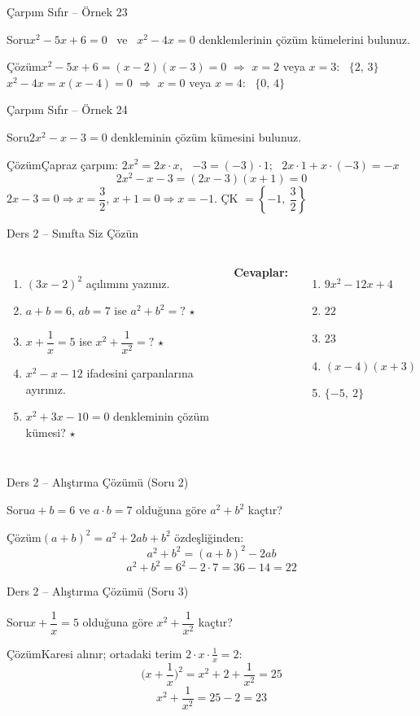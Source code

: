 \documentclass[aspectratio=169,11pt,handout]{beamer}
\newcommand{\soru}[3]{%
\begin{frame}{#1}
  \begin{block}{Soru}\large #2\end{block}
  \pause
  \begin{exampleblock}{Çözüm}\large #3\end{exampleblock}
\end{frame}}
\begin{document}
\soru{Çarpım Sıfır -- Örnek 23}
{\(x^2-5x+6=0\) \ ve \ \(x^2-4x=0\) denklemlerinin çözüm kümelerini bulunuz.}
{\(x^2-5x+6=(x-2)(x-3)=0\) \(\Rightarrow\) \(x=2\) veya \(x=3\): \ \(\{2,\,3\}\)\\[4pt]
\(x^2-4x=x(x-4)=0\) \(\Rightarrow\) \(x=0\) veya \(x=4\): \ \(\{0,\,4\}\)}

\soru{Çarpım Sıfır -- Örnek 24}
{\(2x^2-x-3=0\) denkleminin çözüm kümesini bulunuz.}
{Çapraz çarpım: \(2x^2=2x\cdot x\), \ \(-3=(-3)\cdot 1\); \ \(2x\cdot 1+x\cdot(-3)=-x\) \checkmark
\[2x^2-x-3=(2x-3)(x+1)=0\]
\(2x-3=0\Rightarrow x=\dfrac{3}{2}\), \quad \(x+1=0\Rightarrow x=-1\). \quad ÇK \(=\left\{-1,\ \dfrac{3}{2}\right\}\)}

\begin{frame}{Ders 2 -- Sınıfta Siz Çözün}
\begin{columns}[t]
\begin{enumerate}
\item \((3x-2)^2\) açılımını yazınız.
\item \(a+b=6\), \(ab=7\) ise \(a^2+b^2=?\) \(\star\)
\item \(x+\dfrac{1}{x}=5\) ise \(x^2+\dfrac{1}{x^2}=?\) \(\star\)
\item \(x^2-x-12\) ifadesini çarpanlarına ayırınız.
\item \(x^2+3x-10=0\) denkleminin çözüm kümesi? \(\star\)
\end{enumerate}
\pause
\textbf{Cevaplar:}
\begin{enumerate}
\item \(9x^2-12x+4\)
\item \(22\)
\item \(23\)
\item \((x-4)(x+3)\)
\item \(\{-5,\ 2\}\)
\end{enumerate}
\end{columns}
\vspace{4pt}{\footnotesize \(\star\) işaretli soruların adım adım çözümü sonraki slaytlardadır.}
\end{frame}

\soru{Ders 2 -- Alıştırma Çözümü (Soru 2)}
{\(a+b=6\) ve \(a\cdot b=7\) olduğuna göre \(a^2+b^2\) kaçtır?}
{\((a+b)^2=a^2+2ab+b^2\) özdeşliğinden:
\[a^2+b^2=(a+b)^2-2ab\]
\[a^2+b^2=6^2-2\cdot 7=36-14=22\]}

\soru{Ders 2 -- Alıştırma Çözümü (Soru 3)}
{\(x+\dfrac{1}{x}=5\) olduğuna göre \(x^2+\dfrac{1}{x^2}\) kaçtır?}
{Karesi alınır; ortadaki terim \(2\cdot x\cdot\frac{1}{x}=2\):
\[\Big(x+\frac{1}{x}\Big)^2=x^2+2+\frac{1}{x^2}=25\]
\[x^2+\frac{1}{x^2}=25-2=23\]}
\end{document}
